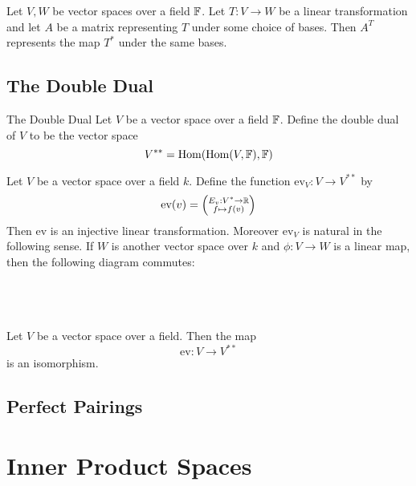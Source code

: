 \documentclass[a4paper]{article}
\begin{document}
\begin{thm}{}{} Let $V,W$ be vector spaces over a field $\mathbb{F}$. Let $T:V\to W$ be a linear transformation and let $A$ be a matrix representing $T$ under some choice of bases. Then $A^T$ represents the map $T^\ast$ under the same bases. 
\end{thm}

\subsection{The Double Dual}
\begin{defn}{The Double Dual}{} Let $V$ be a vector space over a field $\mathbb{F}$. Define the double dual of $V$ to be the vector space $$V^{\ast\ast}=\operatorname{Hom}(\operatorname{Hom}(V,\mathbb{F}),\mathbb{F})$$
\end{defn}

\begin{thm}{}{} Let $V$ be a vector space over a field $k$. Define the function $\text{ev}_V:V\to V^{\ast\ast}$ by $$\text{ev}(v)=\left(\substack{E_v:V^\ast\to\mathbb{R}\\f\mapsto f(v)}\right)$$ Then $\text{ev}$ is an injective linear transformation. Moreover $\text{ev}_V$ is natural in the following sense. If $W$ is another vector space over $k$ and $\phi:V\to W$ is a linear map, then the following diagram commutes: \\~\\
\\~\\
\end{thm}

\begin{lmm}{}{} Let $V$ be a vector space over a field. Then the map $$\text{ev}:V\to V^{\ast\ast}$$ is an isomorphism. 
\end{lmm}

\subsection{Perfect Pairings}

\pagebreak
\section{Inner Product Spaces}
\end{document}
